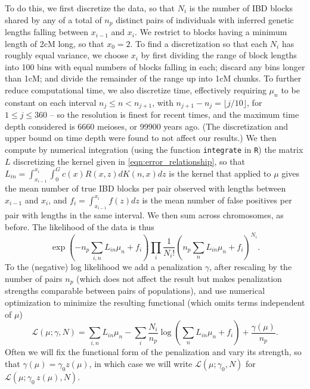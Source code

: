 \documentclass{article}
\newcommand{\calL}{\mathcal{L}}
\begin{document}
To do this, we first discretize the data, so that $N_i$ is the number of IBD blocks 
shared by any of a total of $n_p$ distinct pairs of individuals
with inferred genetic lengths falling between $x_{i-1}$ and $x_i$.
We restrict to blocks having a minimum length of 2cM long, so that $x_0=2$.
To find a discretization so that each $N_i$ has roughly equal variance,
we choose $x_i$ by first dividing the range of block lengths into 100 bins with equal numbers of blocks falling in each;
discard any bins longer than 1cM; and divide the remainder of the range up into 1cM chunks. 
To further reduce computational time,
we also discretize time, effectively requiring $\mu_n$ to be constant on each interval $n_j \le n < n_{j+1}$,
with $n_{j+1}-n_j = \lfloor{j/10}\rfloor$, for $1 \le j \le 360$ -- so the resolution is finest for recent times,
and the maximum time depth considered is 6660 meioses, or 99900 years ago. 
(The discretization and upper bound on time depth were found to not affect our results.)
We then compute by numerical integration (using the function {\tt integrate} in {\tt R})
the matrix $L$ discretizing the kernel given in \eqref{eqn:error_relationship},
so that $L_{in} = \int_{x_{i-1}}^{x_i} \int_0^G c(x) R(x,z) dK(n,x) dz$
is the kernel that applied to $\mu$ gives the mean number of true IBD blocks per pair observed with lengths between $x_{i-1}$ and $x_i$,
and $f_i= \int_{x_{i-1}}^{x_i} f(z) dz$ is the mean number of false positives per pair with lengths in the same interval.
We then sum across chromosomes, as before.
The likelihood of the data is thus
\begin{equation}
    \exp\left( - n_p \sum_{i,n} L_{in} \mu_n + f_i \right) \prod_i \frac{ 1 }{ N_i ! } \left( n_p \sum_n L_{in} \mu_n + f_i \right)^{N_i} .
\end{equation}
To the (negative) log likelihood we add a penalization $\gamma$, 
after rescaling by the number of pairs $n_p$ (which does not affect the result but makes penalization strengths comparable between pairs of populations), 
and use numerical optimization \citep[the {\tt L-BFGS-B} method in {\tt optim},][]{R} to minimize the resulting functional
(which omits terms independent of $\mu$)
\begin{equation}
    \calL(\mu;\gamma,N) = \sum_{i,n} L_{in} \mu_n - \sum_i \frac{N_i}{n_p} \log\left( \sum_n L_{in} \mu_n + f_i \right) + \frac{\gamma(\mu)}{n_p} .
\end{equation}
Often we will fix the functional form of the penalization and vary its strength,
so that $\gamma(\mu) = \gamma_0 z(\mu)$,
in which case we will write $\calL(\mu;\gamma_0,N)$ for $\calL(\mu;\gamma_0\,z(\mu),N)$.
\end{document}
